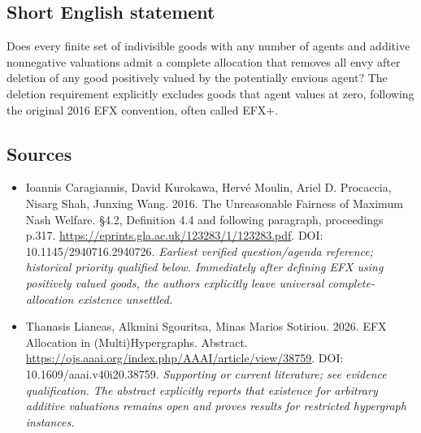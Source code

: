 \documentclass[11pt]{article}
\begin{document}
\subsection{Short English statement}
Does every finite set of indivisible goods with any number of agents and additive nonnegative valuations admit a complete allocation that removes all envy after deletion of any good positively valued by the potentially envious agent? The deletion requirement explicitly excludes goods that agent values at zero, following the original 2016 EFX convention, often called EFX+.

\subsection{Sources}
\begin{itemize}\raggedright
\item[\textnormal{[S1]}]\hypertarget{source:30007558:1}{} Ioannis Caragiannis, David Kurokawa, Hervé Moulin, Ariel D. Procaccia, Nisarg Shah, Junxing Wang. 2016. The Unreasonable Fairness of Maximum Nash Welfare. §4.2, Definition 4.4 and following paragraph, proceedings p.317.
\url{https://eprints.gla.ac.uk/123283/1/123283.pdf}.
DOI: 10.1145/2940716.2940726.
{\small\textit{Earliest verified question/agenda reference; historical priority qualified below. Immediately after defining EFX using positively valued goods, the authors explicitly leave universal complete-allocation existence unsettled.}}

\item[\textnormal{[S2]}]\hypertarget{source:30007558:2}{} Thanasis Lianeas, Alkmini Sgouritsa, Minas Marios Sotiriou. 2026. EFX Allocation in (Multi)Hypergraphs. Abstract.
\url{https://ojs.aaai.org/index.php/AAAI/article/view/38759}.
DOI: 10.1609/aaai.v40i20.38759.
{\small\textit{Supporting or current literature; see evidence qualification. The abstract explicitly reports that existence for arbitrary additive valuations remains open and proves results for restricted hypergraph instances.}}
\end{itemize}
\end{document}
